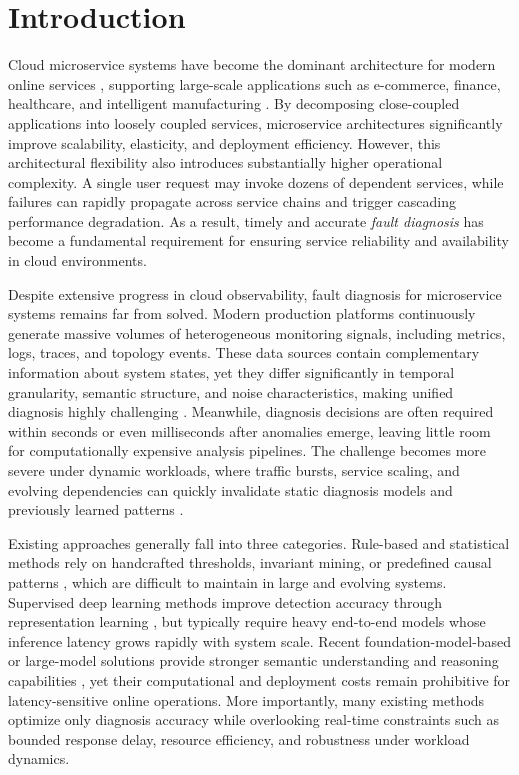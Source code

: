 \section{Introduction}
Cloud microservice systems have become the dominant architecture for modern online services \cite{11342355}, supporting large-scale applications such as e-commerce, finance, healthcare, and intelligent manufacturing \cite{10856683}. By decomposing close-coupled applications into loosely coupled services, microservice architectures significantly improve scalability, elasticity, and deployment efficiency. However, this architectural flexibility also introduces substantially higher operational complexity. A single user request may invoke dozens of dependent services, while failures can rapidly propagate across service chains and trigger cascading performance degradation\cite{zhang2025failure}. As a result, timely and accurate \textit{fault diagnosis} has become a fundamental requirement for ensuring service reliability and availability in cloud environments.

Despite extensive progress in cloud observability,  fault diagnosis for microservice systems remains far from solved. Modern production platforms continuously generate massive volumes of heterogeneous monitoring signals, including metrics, logs, traces, and topology events. These data sources contain complementary information about system states, yet they differ significantly in temporal granularity, semantic structure, and noise characteristics, making unified diagnosis highly challenging \cite{10172617,brandon2020graph}. Meanwhile, diagnosis decisions are often required within seconds or even milliseconds after anomalies emerge, leaving little room for computationally expensive analysis pipelines. The challenge becomes more severe under dynamic workloads, where traffic bursts, service scaling, and evolving dependencies can quickly invalidate static diagnosis models and previously learned patterns \cite{pham2024baro,du2017deeplog}.

Existing approaches generally fall into three categories. Rule-based and statistical methods rely on handcrafted thresholds, invariant mining, or predefined causal patterns \cite{xu2009detecting,lou2010mining}, which are difficult to maintain in large and evolving systems. Supervised deep learning methods improve detection accuracy through representation learning \cite{du2017deeplog,meng2019loganomaly,10172617}, but typically require heavy end-to-end models whose inference latency grows rapidly with system scale. Recent foundation-model-based or large-model solutions provide stronger semantic understanding and reasoning capabilities \cite{guan2024logllm,wu2026icad}, yet their computational and deployment costs remain prohibitive for latency-sensitive online operations. More importantly, many existing methods optimize only diagnosis accuracy while overlooking real-time constraints such as bounded response delay, resource efficiency, and robustness under workload dynamics.

